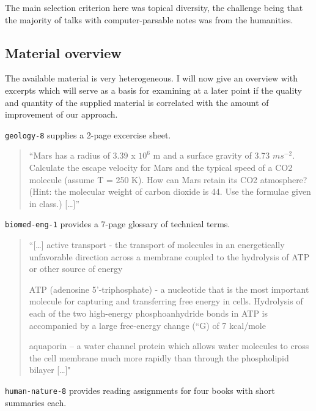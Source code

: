 \documentclass[]{article}
\begin{document}
The main selection criterion here was topical diversity, the challenge
being that the majority of talks with computer-parsable notes was from
the humanities.

\subsection{Material overview}\label{material-overview}

The available material is very heterogeneous. I will now give an
overview with excerpts which will serve as a basis for examining at a
later point if the quality and quantity of the supplied material is
correlated with the amount of improvement of our approach.

\texttt{geology-8} supplies a 2-page excercise sheet.

\begin{quote}
``Mars has a radius of 3.39 x \(10^6\) m and a surface gravity of 3.73
\(ms^{-2}\). Calculate the escape velocity for Mars and the typical
speed of a CO2 molecule (assume T = 250 K). How can Mars retain its CO2
atmosphere? (Hint: the molecular weight of carbon dioxide is 44. Use the
formulae given in class.) {[}\ldots{}{]}''
\end{quote}

\texttt{biomed-eng-1} provides a 7-page glossary of technical terms.

\begin{quote}
``{[}\ldots{}{]} active transport - the transport of molecules in an
energetically unfavorable direction across a membrane coupled to the
hydrolysis of ATP or other source of energy

ATP (adenosine 5'-triphosphate) - a nucleotide that is the most
important molecule for capturing and transferring free energy in cells.
Hydrolysis of each of the two high-energy phosphoanhydride bonds in ATP
is accompanied by a large free-energy change (``G) of 7 kcal/mole

aquaporin -- a water channel protein which allows water molecules to
cross the cell membrane much more rapidly than through the phospholipid
bilayer {[}\ldots{}{]}"
\end{quote}

\texttt{human-nature-8} provides reading assignments for four books with
short summaries each.
\end{document}
